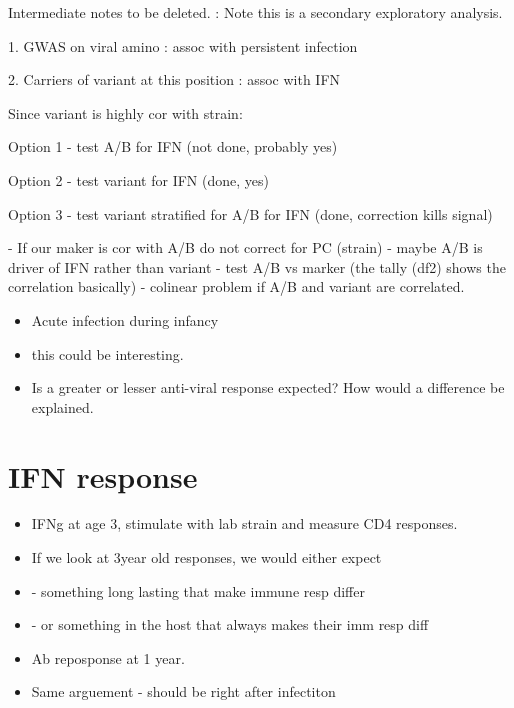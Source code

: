 \documentclass{article}
\begin{document}
Intermediate notes to be deleted. :
Note this is a secondary exploratory analysis.

1. GWAS on viral amino : assoc with persistent infection

2. Carriers of variant at this position : assoc with IFN

Since variant is highly cor with strain: 

Option 1 - test A/B for IFN (not done, probably yes)

Option 2 - test variant for IFN (done, yes)

Option 3 - test variant stratified for A/B for IFN (done, correction kills signal)



 - If our maker is cor with A/B do not correct for PC (strain)
 - maybe A/B is driver of IFN rather than variant
 - test A/B vs marker  (the tally (df2) shows the correlation basically)
 - colinear problem if A/B and variant are correlated. 

\begin{itemize}

    \item Acute infection during infancy
    \item this could be interesting. 
    \item Is a greater or lesser anti-viral response expected? How would a difference be explained.  
\end{itemize}

\section{IFN response}
\begin{itemize}
    \item IFNg at age 3, stimulate with lab strain and measure CD4 responses. 
    \item If we look at 3year old responses, we would either expect
    \item - something long lasting that make immune resp differ
    \item -  or something in the host that always makes their imm resp diff
\end{itemize}

\begin{itemize}
\item Ab reposponse at 1 year. 
\item Same arguement - should be right after infectiton
\end{itemize}
\end{document}
